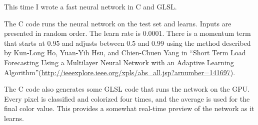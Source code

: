 \documentclass[11pt]{article}
\begin{document}
This time I wrote a fast neural network in C and GLSL.

The C code runs the neural network on the test set and learns. Inputs are presented in random order. The learn rate is 0.0001. There is a momentum term that starts at 0.95 and adjusts between 0.5 and 0.99 using the method described by Kun-Long Ho, Yuan-Yih Hsu, and Chien-Chuen Yang in ``Short Term Load Forecasting Using a Multilayer Neural Network with an Adaptive Learning Algorithm''(\url{http://ieeexplore.ieee.org/xpls/abs_all.jsp?arnumber=141697}).

The C code also generates some GLSL code that runs the network on the GPU. Every pixel is classified and colorized four times, and the average is used for the final color value. This provides a somewhat real-time preview of the network as it learns.
\end{document}
